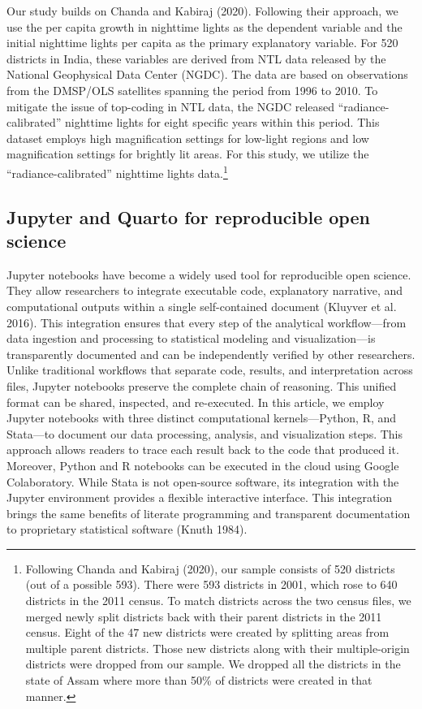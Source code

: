 \documentclass[
  letterpaper,
  DIV=11,
  numbers=noendperiod]{scrartcl}
\begin{document}
Our study builds on Chanda and Kabiraj (2020). Following their approach,
we use the per capita growth in nighttime lights as the dependent
variable and the initial nighttime lights per capita as the primary
explanatory variable. For 520 districts in India, these variables are
derived from NTL data released by the National Geophysical Data Center
(NGDC). The data are based on observations from the DMSP/OLS satellites
spanning the period from 1996 to 2010. To mitigate the issue of
top-coding in NTL data, the NGDC released ``radiance-calibrated''
nighttime lights for eight specific years within this period. This
dataset employs high magnification settings for low-light regions and
low magnification settings for brightly lit areas. For this study, we
utilize the ``radiance-calibrated'' nighttime lights data.\footnote{Following
  Chanda and Kabiraj (2020), our sample consists of 520 districts (out
  of a possible 593). There were 593 districts in 2001, which rose to
  640 districts in the 2011 census. To match districts across the two
  census files, we merged newly split districts back with their parent
  districts in the 2011 census. Eight of the 47 new districts were
  created by splitting areas from multiple parent districts. Those new
  districts along with their multiple-origin districts were dropped from
  our sample. We dropped all the districts in the state of Assam where
  more than 50\% of districts were created in that manner.}

\subsection{Jupyter and Quarto for reproducible open
science}\label{jupyter-and-quarto-for-reproducible-open-science}

Jupyter notebooks have become a widely used tool for reproducible open
science. They allow researchers to integrate executable code,
explanatory narrative, and computational outputs within a single
self-contained document (Kluyver et al. 2016). This integration ensures
that every step of the analytical workflow---from data ingestion and
processing to statistical modeling and visualization---is transparently
documented and can be independently verified by other researchers.
Unlike traditional workflows that separate code, results, and
interpretation across files, Jupyter notebooks preserve the complete
chain of reasoning. This unified format can be shared, inspected, and
re-executed. In this article, we employ Jupyter notebooks with three
distinct computational kernels---Python, R, and Stata---to document our
data processing, analysis, and visualization steps. This approach allows
readers to trace each result back to the code that produced it.
Moreover, Python and R notebooks can be executed in the cloud using
Google Colaboratory. While Stata is not open-source software, its
integration with the Jupyter environment provides a flexible interactive
interface. This integration brings the same benefits of literate
programming and transparent documentation to proprietary statistical
software (Knuth 1984).
\end{document}
